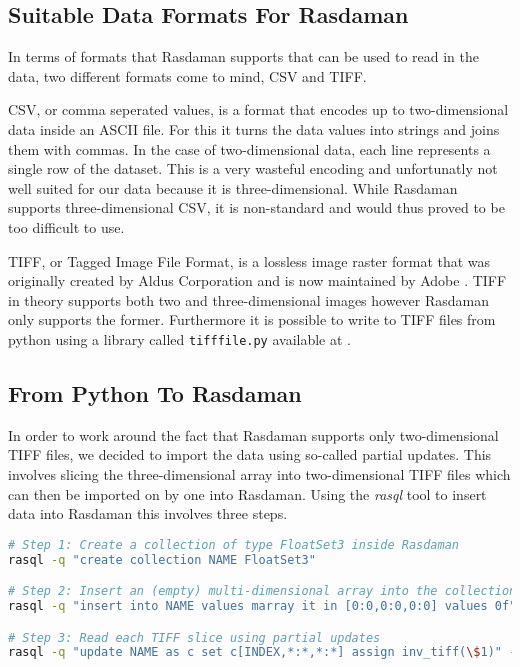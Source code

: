 \subsection{Suitable Data Formats For Rasdaman}

In terms of formats that Rasdaman supports that can be used to read in the data, two different formats come to mind, CSV and TIFF.

CSV, or comma seperated values, is a format that encodes up to two-dimensional data inside an ASCII file. For this it turns the data values into strings and joins them with commas. In the case of two-dimensional data, each line represents a single row of the dataset. This is a very wasteful encoding and unfortunatly not well suited for our data because it is three-dimensional. While Rasdaman supports three-dimensional CSV, it is non-standard and would thus proved to be too difficult to use.

TIFF, or Tagged Image File Format, is a lossless image raster format that was originally created by Aldus Corporation and is now maintained by Adobe \cite{tiff:website}. TIFF in theory supports both two and three-dimensional images however Rasdaman only supports the former. Furthermore it is possible to write to TIFF files from python using a library called \lstinline{tifffile.py} available at \cite{tifffile:website}.

\subsection{From Python To Rasdaman}

In order to work around the fact that Rasdaman supports only two-dimensional TIFF files, we decided to import the data using so-called partial updates. This involves slicing the three-dimensional array into two-dimensional TIFF files which can then be imported on by one into Rasdaman. Using the \textit{rasql} tool to insert data into Rasdaman this involves three steps.

\begin{lstlisting}[showstringspaces=false,morekeywords={NAME},language=Bash]
# Step 1: Create a collection of type FloatSet3 inside Rasdaman
rasql -q "create collection NAME FloatSet3"

# Step 2: Insert an (empty) multi-dimensional array into the collection
rasql -q "insert into NAME values marray it in [0:0,0:0,0:0] values 0f"

# Step 3: Read each TIFF slice using partial updates
rasql -q "update NAME as c set c[INDEX,*:*,*:*] assign inv_tiff(\$1)" --file FILENAME.tiff
\end{lstlisting}

